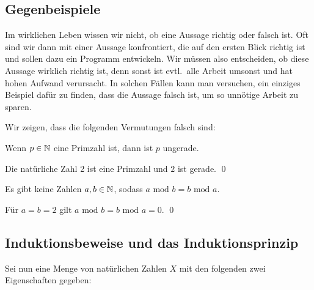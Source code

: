 \subsection{Gegenbeispiele}
Im wirklichen Leben wissen wir nicht, ob eine Aussage richtig oder
falsch ist. Oft sind wir dann mit einer Aussage konfrontiert, die auf
den ersten Blick richtig ist und sollen dazu ein Programm
entwickeln. Wir müssen also entscheiden, ob diese Aussage wirklich
richtig ist, denn sonst ist evtl.~alle Arbeit umsonst und hat hohen
Aufwand verursacht. In solchen Fällen kann man versuchen, ein einziges
Beispiel dafür zu finden, dass die Aussage falsch ist, um so unnötige
Arbeit zu sparen.

\bigskip

\noindent Wir zeigen, dass die folgenden Vermutungen falsch sind:
\begin{conjecture}
Wenn $p \in \mathbb N$ eine Primzahl ist, dann ist $p$ ungerade.
\end{conjecture}

\begin{counterexample}
Die natürliche Zahl 2 ist eine Primzahl und $2$ ist gerade. \qed
\end{counterexample}

\begin{conjecture}
Es gibt keine Zahlen $a,b \in \mathbb N$, sodass $a \textrm{ mod } b = b
\textrm{ mod } a$.
\end{conjecture}

\begin{counterexample}
Für $a = b = 2$ gilt $a \textrm{ mod } b = b \textrm{ mod } a = 0$. \qed
\end{counterexample}

\subsection{Induktionsbeweise und das Induktionsprinzip}

Sei nun eine Menge von natürlichen Zahlen $X$ mit den folgenden zwei Eigenschaften
gegeben:

\medskip


